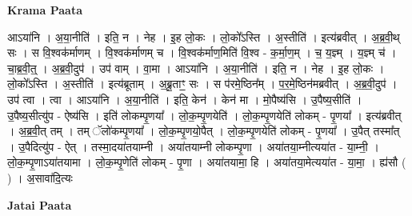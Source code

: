 \documentclass[17pt]{extarticle}
\begin{document}
\textbf{Krama Paata} \newline

आऽया॑नि । अ॒या॒नीति॑ । इति॒ न । नेह । इ॒ह लो॒कः । लो॒को᳚ऽस्ति । अ॒स्तीति॑ । इत्य॑ब्रवीत् । अ॒ब्र॒वी॒थ् सः । स वि॒श्वक॑र्माणम् । वि॒श्वक॑र्माणम् च । वि॒श्वक॑र्माण॒मिति॑ वि॒श्व - क॒र्मा॒ण॒म् । च॒ य॒ज्ञ्म् । य॒ज्ञ्म् च॑ । चा॒ब्र॒वी॒त्॒ । अ॒ब्र॒वी॒दुप॑ । उप॑ वाम् । वा॒मा । आऽया॑नि । अ॒या॒नीति॑ । इति॒ न । नेह । इ॒ह लो॒कः । लो॒को᳚ऽस्ति । अ॒स्तीति॑ । इत्य॑ब्रूताम् । अ॒ब्रू॒ताꣳ॒॒ सः । स प॑रमे॒ष्ठिन᳚म् । प॒र॒मे॒ष्ठिन॑मब्रवीत् । 
अ॒ब्र॒वी॒दुप॑ । उप॑ त्वा । त्वा । आऽया॑नि । अ॒या॒नीति॑ । इति॒ केन॑ । केन॑ मा । मो॒पैष्य॑सि । उ॒पैष्य॒सीति॑ । उ॒पैष्य॒सीत्यु॑प - ऐष्य॑सि । इति॑ लोकम्पृ॒णया᳚ । लो॒क॒म्पृ॒णयेति॑ । लो॒क॒म्पृ॒णयेति॑ लोकम् - पृ॒णया᳚ । इत्य॑ब्रवीत् । अ॒ब्र॒वी॒त् तम् । तम् ॅलो॑कम्पृ॒णया᳚ । लो॒क॒म्पृ॒णयो॒पैत् । लो॒क॒म्पृ॒णयेति॑ लोकम् - पृ॒णया᳚ । उ॒पैत् तस्मा᳚त् । उ॒पैदित्यु॑प - ऐत् । तस्मा॒दया॑तयाम्नी । अया॑तयाम्नी लोकम्पृ॒णा । अया॑तया॒म्नीत्यया॑त - या॒म्नी॒ । लो॒क॒म्पृ॒णाऽया॑तयामा । लो॒क॒म्पृ॒णेति॑ लोकम् - पृ॒णा । अया॑तयामा॒ हि । अया॑तया॒मेत्यया॑त - या॒मा॒ । ह्य॑सौ ( ) । अ॒सावा॑दि॒त्यः \newline

\textbf{Jatai Paata} \newline
\end{document}
